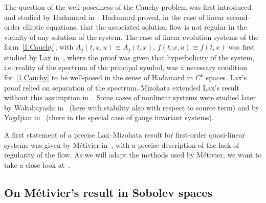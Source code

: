\documentclass[10pt]{amsart}
\theoremstyle{definition}
\theoremstyle{plain}
\begin{document}
The question of the well-posedness of the Cauchy problem was first introduced and studied by Hadamard in~\cite{hadamard1902problemes}. Hadamard proved, in the case of linear second-order elliptic equations, that the associated solution flow is not regular in the vicinity of any solution of the system. The case of linear evolution systems of the form~\eqref{1.Cauchy}, with $A_j(t,x,u) \equiv A_j(t,x) $, $f(t,x,u) \equiv f(t,x)$ was first studied by Lax in~\cite{lax2005asymptotic}, where the proof was given that hyperbolicity of the system, i.e. reality of the spectrum of the principal symbol, was a necessary condition for~\eqref{1.Cauchy} to be well-posed in the sense of Hadamard in $C^k$ spaces. Lax's proof relied on separation of the spectrum. Mizohata extended Lax's result without this assumption in~\cite{mizohata1961some}. Some cases of nonlinear systems were studied later by Wakabayashi in~\cite{wakabayashi2001lax} (here with stability also with respect to source term) and by Yagdjian in~\cite{yagdjian2002lax,yagdjian1998note} (there in the special case of gauge invariant systems).

A first statement of a precise Lax--Mizohata result for first-order quasi-linear systems was given by Métivier in~\cite{metivier2005remarks}, with a precise description of the lack of regularity of the flow. As we will adapt the methods used by Métivier, we want to take a close look at~\cite{metivier2005remarks}.


\subsection{On Métivier's result in Sobolev spaces}\label{1.subsubsection.metivier}
\end{document}
